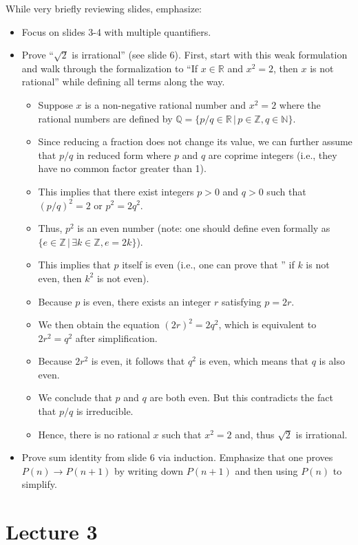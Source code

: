 \documentclass[10pt,english]{article}
\begin{document}
While very briefly reviewing slides,  emphasize:
\begin{itemize}
  \item Focus on slides 3-4 with multiple quantifiers.
  \item Prove ``$\sqrt{2}$ is irrational'' (see slide 6).  First, start with this weak formulation and walk through the formalization to ``If $x \in \mathbb{R}$ and $x^2=2$, then $x$ is not rational'' while defining all terms along the way.
  \begin{itemize}
    \item Suppose $x$ is a non-negative rational number and $x^2=2$ where the rational numbers are defined by $\mathbb{Q} = \{ p/q \in \mathbb{R} \,|\, p\in \mathbb{Z}, q \in \mathbb{N} \}$.
    \item Since reducing a fraction does not change its value, we can further assume that $p/q$ in reduced form where $p$ and $q$ are coprime integers (i.e., they have no common factor greater than 1).
    \item This implies that there exist integers $p>0$ and $q>0$ such that $(p/q)^2 = 2$ or $p^2 = 2 q^2$.
    \item Thus, $p^2$ is an even number (note: one should define even formally as $\{e \in \mathbb{Z} \,|\, \exists k \in \mathbb{Z}, e=2k \}$).
    \item This implies that $p$ itself is even (i.e., one can prove that '' if $k$ is not even, then $k^2$ is not even).
    \item Because $p$ is even, there exists an integer $r$ satisfying $p = 2r$.
    \item  We then obtain the equation $(2r)^2 = 2q^2$, which is equivalent to $2r^2 = q^2$ after simplification.
    \item  Because $2r^2$ is even, it follows that $q^2$ is even, which means that $q$ is also even.
    \item We conclude that $p$ and $q$ are both even. But this contradicts the fact that $p/q$ is irreducible.
    \item Hence, there is no rational $x$  such that $x^2 = 2$ and, thus  $\sqrt{2}$ is irrational.
  \end{itemize}
  \item Prove sum identity from slide 6 via induction.  Emphasize that one proves $P(n) \to P(n+1)$ by writing down $P(n+1)$ and then using $P(n)$ to simplify.
\end{itemize}

\section*{Lecture 3}
\end{document}
